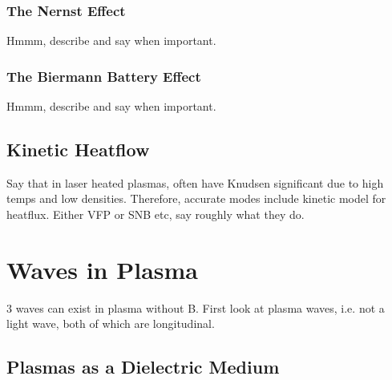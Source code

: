 \subsubsection{The Nernst Effect}%
\label{sec:theory_nernst}

Hmmm, describe and say when important.

\subsubsection{The Biermann Battery Effect}%
\label{sec:theory_biermann}

Hmmm, describe and say when important.

\subsection{Kinetic Heatflow}%
\label{sec:theory_kineticheatflow}

Say that in laser heated plasmas, often have Knudsen significant due to high temps and low densities.
Therefore, accurate modes include kinetic model for heatflux.
Either VFP or SNB etc, say roughly what they do.

\section{Waves in Plasma}%
\label{sec:theory_waves_plasmas}

3 waves can exist in plasma without B.
First look at plasma waves, i.e. not a light wave, both of which are longitudinal.

\subsection{Plasmas as a Dielectric Medium}%
\label{sec:theory_dielectric}

